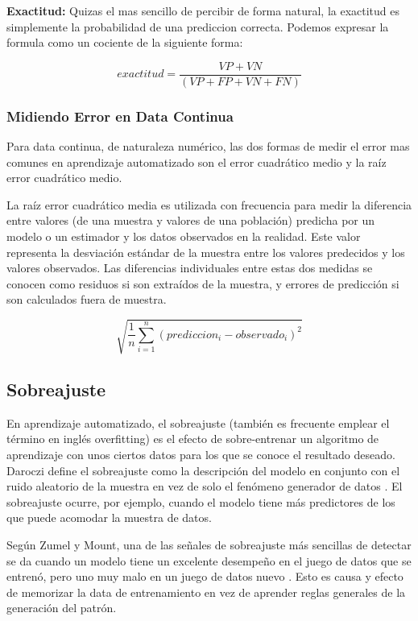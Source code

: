 \documentclass[letterpaper, spanish, 11pt]{report}
\begin{document}
\textbf{Exactitud:} Quizas el mas sencillo de percibir de forma natural, la exactitud es simplemente la probabilidad de una prediccion correcta. Podemos expresar la formula como un cociente de la siguiente forma:

\begin{equation}
exactitud = \frac{VP + VN}{(VP + FP + VN + FN)}
\end{equation}

\subsubsection{Midiendo Error en Data Continua}
Para data continua, de naturaleza numérico, las dos formas de medir el error mas comunes en aprendizaje automatizado son el error cuadrático medio y la raíz error cuadrático medio. 


La raíz error cuadrático media es utilizada con frecuencia para medir la diferencia entre valores (de una muestra y valores de una población) predicha por un modelo o un estimador y los datos observados en la realidad. Este valor representa la desviación estándar de la muestra entre los valores predecidos y los valores observados. Las diferencias individuales entre estas dos medidas se conocen como residuos si son extraídos de la muestra, y errores de predicción si son calculados fuera de muestra. 

\begin{equation}
\sqrt{\frac{1}{n}\sum_{i=1}^n(prediccion_{i} - observado_{i})^{2}}
\end{equation}

\subsection{Sobreajuste}
En aprendizaje automatizado, el sobreajuste (también es frecuente emplear el término en inglés overfitting) es el efecto de sobre-entrenar un algoritmo de aprendizaje con unos ciertos datos para los que se conoce el resultado deseado. Daroczi define el sobreajuste como la descripción del modelo en conjunto con el ruido aleatorio de la muestra en vez de solo el fenómeno generador de datos \cite{daroczi}. El sobreajuste ocurre, por ejemplo, cuando el modelo tiene más predictores de los que puede acomodar la muestra de datos.

Según Zumel y Mount, una de las señales de sobreajuste más sencillas de detectar se da cuando un modelo tiene un excelente desempeño en el juego de datos que se entrenó, pero uno muy malo en un juego de datos nuevo \cite{zumelMount}. Esto es causa y efecto de memorizar la data de entrenamiento en vez de aprender reglas generales de la generación del patrón. 
\end{document}
